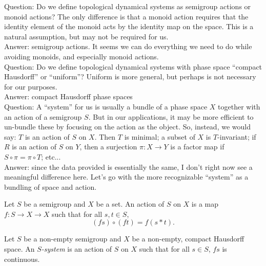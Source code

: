 \begin{leanrmk}
    Question: Do we define topological dynamical systems as semigroup actions or monoid actions?  The only difference is that a monoid action requires that the identity element of the monoid acts by the identity map on the space.  This is a natural assumption, but may not be required for us.\\
    
    Answer: semigroup actions.  It seems we can do everything we need to do while avoiding monoids, and especially monoid actions.\\

    Question: Do we define topological dynamical systems with phase space ``compact Hausdorff'' or ``uniform''?  Uniform is more general, but perhaps is not necessary for our purposes.\\
    
    Answer: compact Hausdorff phase spaces\\

    Question: A ``system'' for us is usually a bundle of a phase space $X$ together with an action of a semigroup $S$.  But in our applications, it may be more efficient to un-bundle these by focusing on the action as the object.  So, instead, we would say: $T$ is an action of $S$ on $X$.  Then $T$ is minimal; a subset of $X$ is $T$-invariant; if $R$ is an action of $S$ on $Y$, then a surjection $\pi: X \to Y$ is a factor map if $S \circ \pi = \pi \circ T$; etc...\\
    
    Answer: since the data provided is essentially the same, I don't right now see a meaningful difference here.  Let's go with the more recognizable ``system'' as a bundling of space and action.
\end{leanrmk}

\begin{definition}
\leanok{}
Let $S$ be a semigroup and $X$ be a set.  An action of $S$ on $X$ is a map $f: S \to X \to X$ such that for all $s, t \in S$,
\[(f s) \circ (f t) = f (s*t).\]
\end{definition}

\begin{definition}
\leanok{}
    Let $S$ be a non-empty semigroup and $X$ be a non-empty, compact Hausdorff space. An \emph{$S$-system} is an action of $S$ on $X$ such that for all $s \in S$, $f s$ is continuous.
\end{definition}

